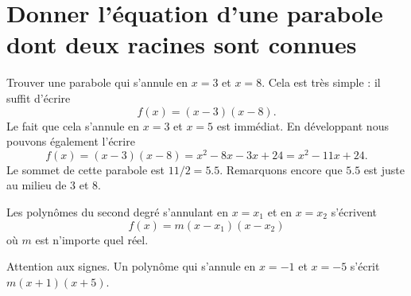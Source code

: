 
\section{Donner l'équation d'une parabole dont deux racines sont connues}

\begin{example}
    Trouver une parabole qui s'annule en \( x=3\) et \( x=8\). Cela est très simple : il suffit d'écrire
    \begin{equation}
        f(x)=(x-3)(x-8).
    \end{equation}
    Le fait que cela s'annule en \( x=3\) et \( x=5\) est immédiat. En développant nous pouvons également l'écrire
    \begin{equation}
        f(x)=(x-3)(x-8)=x^2-8x-3x+24=x^2-11x+24.
    \end{equation}
    Le sommet de cette parabole est \( 11/2=5.5\). Remarquons encore que \( 5.5\) est juste au milieu de \( 3\) et \( 8\).
\end{example}

\begin{Aretenir}
    Les polynômes du second degré s'annulant en \( x=x_1\) et en \( x=x_2\) s'écrivent 
    \begin{equation}
        f(x)=m(x-x_1)(x-x_2)
    \end{equation}
    où \( m\) est n'importe quel réel.
\end{Aretenir}

Attention aux signes. Un polynôme qui s'annule en \( x=-1\) et \( x=-5\) s'écrit \( m(x+1)(x+5)\).

